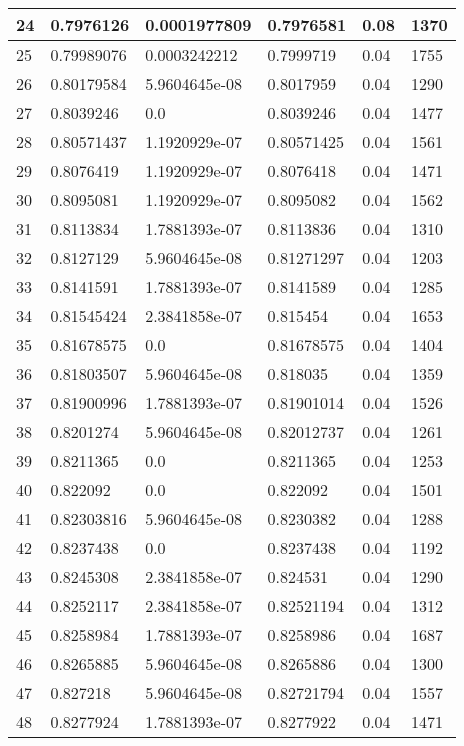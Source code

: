 \begin{longtable}{|l|l|l|l|l|l|}
24 & 0.7976126 & 0.0001977809 & 0.7976581 & 0.08 & 1370 \\ \hline 
25 & 0.79989076 & 0.0003242212 & 0.7999719 & 0.04 & 1755 \\ \hline 
26 & 0.80179584 & 5.9604645e-08 & 0.8017959 & 0.04 & 1290 \\ \hline 
27 & 0.8039246 & 0.0 & 0.8039246 & 0.04 & 1477 \\ \hline 
28 & 0.80571437 & 1.1920929e-07 & 0.80571425 & 0.04 & 1561 \\ \hline 
29 & 0.8076419 & 1.1920929e-07 & 0.8076418 & 0.04 & 1471 \\ \hline 
30 & 0.8095081 & 1.1920929e-07 & 0.8095082 & 0.04 & 1562 \\ \hline 
31 & 0.8113834 & 1.7881393e-07 & 0.8113836 & 0.04 & 1310 \\ \hline 
32 & 0.8127129 & 5.9604645e-08 & 0.81271297 & 0.04 & 1203 \\ \hline 
33 & 0.8141591 & 1.7881393e-07 & 0.8141589 & 0.04 & 1285 \\ \hline 
34 & 0.81545424 & 2.3841858e-07 & 0.815454 & 0.04 & 1653 \\ \hline 
35 & 0.81678575 & 0.0 & 0.81678575 & 0.04 & 1404 \\ \hline 
36 & 0.81803507 & 5.9604645e-08 & 0.818035 & 0.04 & 1359 \\ \hline 
37 & 0.81900996 & 1.7881393e-07 & 0.81901014 & 0.04 & 1526 \\ \hline 
38 & 0.8201274 & 5.9604645e-08 & 0.82012737 & 0.04 & 1261 \\ \hline 
39 & 0.8211365 & 0.0 & 0.8211365 & 0.04 & 1253 \\ \hline 
40 & 0.822092 & 0.0 & 0.822092 & 0.04 & 1501 \\ \hline 
41 & 0.82303816 & 5.9604645e-08 & 0.8230382 & 0.04 & 1288 \\ \hline 
42 & 0.8237438 & 0.0 & 0.8237438 & 0.04 & 1192 \\ \hline 
43 & 0.8245308 & 2.3841858e-07 & 0.824531 & 0.04 & 1290 \\ \hline 
44 & 0.8252117 & 2.3841858e-07 & 0.82521194 & 0.04 & 1312 \\ \hline 
45 & 0.8258984 & 1.7881393e-07 & 0.8258986 & 0.04 & 1687 \\ \hline 
46 & 0.8265885 & 5.9604645e-08 & 0.8265886 & 0.04 & 1300 \\ \hline 
47 & 0.827218 & 5.9604645e-08 & 0.82721794 & 0.04 & 1557 \\ \hline 
48 & 0.8277924 & 1.7881393e-07 & 0.8277922 & 0.04 & 1471 \\ \hline 

\end{longtable}

